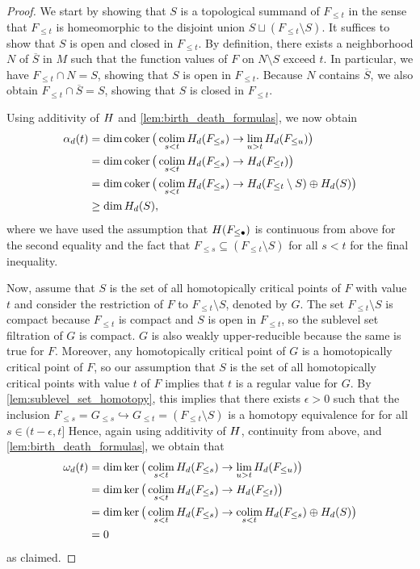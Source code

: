 \begin{proof}
	We start by showing that $S$ is a topological summand of $F_{\leq t}$ in the sense that $F_{\leq t}$ is homeomorphic to the disjoint union $S \sqcup (F_{\leq t} \setminus S)$.
	It suffices to show that $S$ is open and closed in $F_{\leq t}$.
	By definition, there exists a neighborhood $N$ of $\overline{S}$ in $M$ such that the function values of $F$ on $N \setminus S$ exceed $t$.
	In particular, we have $F_{\leq t} \cap N = S$, showing that $S$ is open in $F_{\leq t}$.
	Because $N$ contains $\overline{S}$, we also obtain $F_{\leq t} \cap \overline{S} = S$, showing that $S$ is closed in $F_{\leq t}$.

	Using additivity of $H$ and \cref{lem:birth_death_formulas}, we now obtain
	\begin{align*}
		\alpha_d(t) &= \dim \operatorname{coker} \big( \operatorname*{colim}_{s < t} H_d(F_{\leq s}) \to \lim_{u > t} H_d(F_{\leq u}) \big) \\
			&= \dim \operatorname{coker} \big( \operatorname*{colim}_{s < t} H_d(F_{\leq s}) \to H_d(F_{\leq t}) \big) \\
			&= \dim \operatorname{coker} \big( \operatorname*{colim}_{s < t} H_d(F_{\leq s}) \to H_d(F_{\leq t} \setminus S) \oplus H_d(S) \big) \\
			&\geq \dim H_d(S),
	\end{align*}
	where we have used the assumption that $H(F_{\leq \bullet})$ is continuous from above for the second equality and the fact that $F_{\leq s} \subseteq (F_{\leq t} \setminus S)$ for all $s < t$ for the final inequality.

	Now, assume that $S$ is the set of all homotopically critical points of $F$ with value~$t$ and consider the restriction of $F$ to $F_{\leq t} \setminus S$, denoted by $G$.
	The set $F_{\leq t} \setminus S$ is compact because $F_{\leq t}$ is compact and $S$ is open in $F_{\leq t}$, so the sublevel set filtration of $G$ is compact.
	$G$ is also weakly upper-reducible because the same is true for $F$.
	Moreover, any homotopically critical point of $G$ is a homotopically critical point of $F$, so our assumption that $S$ is the set of all homotopically critical points with value $t$ of $F$ implies that $t$ is a regular value for $G$.
	By \cref{lem:sublevel_set_homotopy},  this implies that there exists $\epsilon > 0$ such that the inclusion $F_{\leq s} = G_{\leq s} \hookrightarrow G_{\leq t} = (F_{\leq t} \setminus S)$ is a homotopy equivalence for for all $s \in (t - \epsilon, t]$
	Hence, again using additivity of $H$, continuity from above, and \cref{lem:birth_death_formulas}, we obtain that
	\begin{align*}
		\omega_d(t) &= \dim \ker \big( \operatorname*{colim}_{s < t} H_d(F_{\leq s}) \to \lim_{u > t} H_d(F_{\leq u}) \big) \\
				&= \dim \ker \big( \operatorname*{colim}_{s < t} H_d(F_{\leq s}) \to H_d(F_{\leq t}) \big) \\
				&= \dim \ker \big( \operatorname*{colim}_{s < t} H_d(F_{\leq s}) \to \operatorname*{colim}_{s < t} H_d(F_{\leq s}) \oplus H_d(S) \big) \\
				&= 0
	\end{align*}
	as claimed.
\end{proof}

